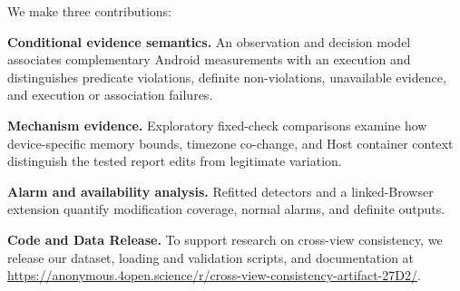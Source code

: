 We make three contributions:

\textbf{Conditional evidence semantics.} An observation and decision model associates complementary Android measurements with an execution and distinguishes predicate violations, definite non-violations, unavailable evidence, and execution or association failures.

\textbf{Mechanism evidence.} Exploratory fixed-check comparisons examine how device-specific memory bounds, timezone co-change, and Host container context distinguish the tested report edits from legitimate variation.

\textbf{Alarm and availability analysis.} Refitted detectors and a linked-Browser extension quantify modification coverage, normal alarms, and definite outputs.

\textbf{Code and Data Release.} To support research on cross-view consistency, we release our dataset, loading and validation scripts, and documentation at \url{https://anonymous.4open.science/r/cross-view-consistency-artifact-27D2/}.
